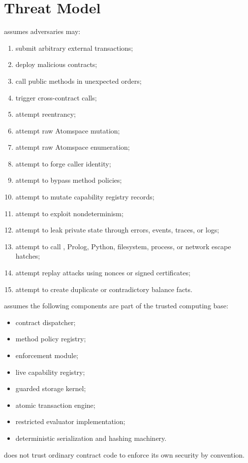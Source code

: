 \section{Threat Model}

\SCS{} assumes adversaries may:

\begin{enumerate}
  \item submit arbitrary external transactions;
  \item deploy malicious contracts;
  \item call public methods in unexpected orders;
  \item trigger cross-contract calls;
  \item attempt reentrancy;
  \item attempt raw Atomspace mutation;
  \item attempt raw Atomspace enumeration;
  \item attempt to forge caller identity;
  \item attempt to bypass method policies;
  \item attempt to mutate capability registry records;
  \item attempt to exploit nondeterminism;
  \item attempt to leak private state through errors, events, traces, or logs;
  \item attempt to call \PeTTa{}, Prolog, Python, filesystem, process, or network escape hatches;
  \item attempt replay attacks using nonces or signed certificates;
  \item attempt to create duplicate or contradictory balance facts.
\end{enumerate}

\SCS{} assumes the following components are part of the trusted computing base:

\begin{itemize}
  \item contract dispatcher;
  \item method policy registry;
  \item enforcement module;
  \item live capability registry;
  \item guarded storage kernel;
  \item atomic transaction engine;
  \item restricted evaluator implementation;
  \item deterministic serialization and hashing machinery.
\end{itemize}

\SCS{} does not trust ordinary contract code to enforce its own security by convention.
